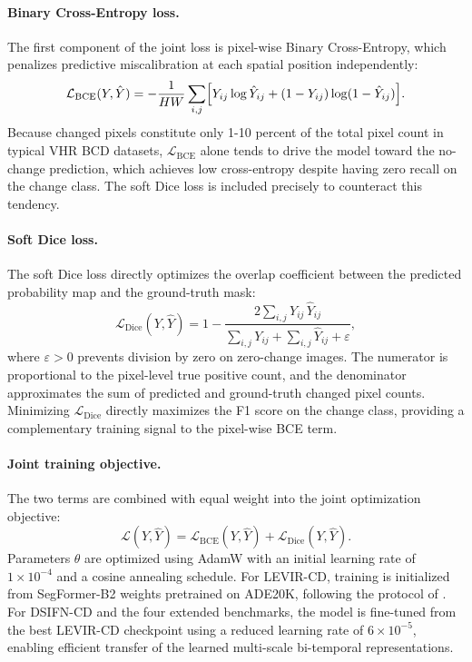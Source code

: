 \paragraph{Binary Cross-Entropy loss.} The first component of the joint loss is pixel-wise Binary Cross-Entropy, which penalizes predictive miscalibration at each spatial position independently:
\begin{equation}
\mathcal{L}_{\mathrm{BCE}}(Y, \hat{Y})
    = -\frac{1}{HW} \sum_{i,j}
      \Bigl[
        Y_{ij} \log \hat{Y}_{ij}
        + (1 - Y_{ij}) \log(1 - \hat{Y}_{ij})
      \Bigr].
\label{eq:bce_loss}
\end{equation}
Because changed pixels constitute only 1-10 percent of the total pixel count in typical \ac{VHR} \ac{BCD} datasets, $\mathcal{L}_{\mathrm{BCE}}$ alone tends to drive the model toward the no-change prediction, which achieves low cross-entropy despite having zero recall on the change class. The soft Dice loss is included precisely to counteract this tendency.

\paragraph{Soft Dice loss.} The soft Dice loss directly optimizes the overlap coefficient between the predicted probability map and the ground-truth mask:
\begin{equation}
\mathcal{L}_{\mathrm{Dice}}(Y, \hat{Y})
    = 1 - \frac{2\displaystyle\sum_{i,j} Y_{ij}\,\hat{Y}_{ij}}
               {\displaystyle\sum_{i,j} Y_{ij}
                + \displaystyle\sum_{i,j} \hat{Y}_{ij} + \varepsilon},
\label{eq:dice_loss}
\end{equation}
where $\varepsilon > 0$ prevents division by zero on zero-change images. The numerator is proportional to the pixel-level true positive count, and the denominator approximates the sum of predicted and ground-truth changed pixel counts. Minimizing $\mathcal{L}_{\mathrm{Dice}}$ directly maximizes the F1 score on the change class, providing a complementary training signal to the pixel-wise \ac{BCE} term.

\paragraph{Joint training objective.} The two terms are combined with equal weight into the joint optimization objective:
\begin{equation}
\mathcal{L}(Y, \hat{Y})
    = \mathcal{L}_{\mathrm{BCE}}(Y, \hat{Y})
    + \mathcal{L}_{\mathrm{Dice}}(Y, \hat{Y}).
\label{eq:joint_loss}
\end{equation}
Parameters $\theta$ are optimized using AdamW with an initial learning rate of $1 \times 10^{-4}$ and a cosine annealing schedule. For LEVIR-CD, training is initialized from SegFormer-B2 weights pretrained on ADE20K, following the protocol of \cite{Bandara2022ChangeFormer}. For DSIFN-CD and the four extended benchmarks, the model is fine-tuned from the best LEVIR-CD checkpoint using a reduced learning rate of $6 \times 10^{-5}$, enabling efficient transfer of the learned multi-scale bi-temporal representations.


